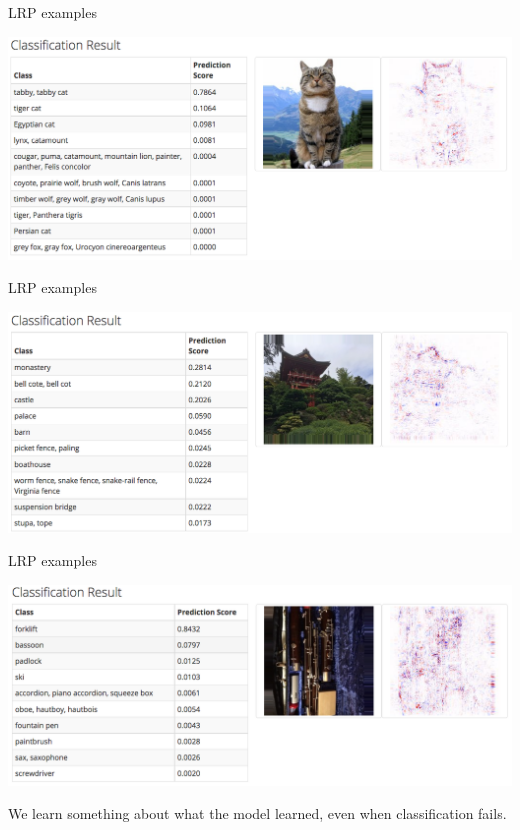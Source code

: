 \documentclass[xetex,compress]{beamer}
\begin{document}
\begin{frame}{LRP examples}
  \begin{center}
    \includegraphics[width=1.00\textwidth]{./figures/lrp_example_1.png}
  \end{center}
\end{frame}

\begin{frame}{LRP examples}
  \begin{center}
    \includegraphics[width=1.00\textwidth]{./figures/lrp_example_2.png}
  \end{center}
\end{frame}

\begin{frame}{LRP examples}
  \begin{center}
    \includegraphics[width=1.00\textwidth]{./figures/lrp_example_3.png}
  \end{center}
  We learn something about what the model learned, even when classification fails.
\end{frame}
\end{document}
